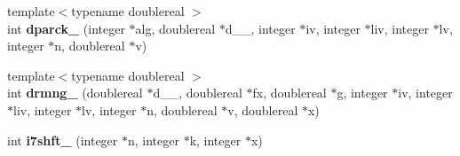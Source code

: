 \begin{DoxyCompactItemize}
\item 
\hypertarget{namespaceport_aa9d480b7014a5add89ca0704e8595e95}{{\footnotesize template$<$typename doublereal $>$ }\\int {\bfseries dparck\+\_\+} (integer $\ast$alg, doublereal $\ast$d\+\_\+\+\_\+, integer $\ast$iv, integer $\ast$liv, integer $\ast$lv, integer $\ast$n, doublereal $\ast$v)}\label{namespaceport_aa9d480b7014a5add89ca0704e8595e95}

\item 
\hypertarget{namespaceport_a08a68b753cfb320121bca4bcdabdb6ab}{{\footnotesize template$<$typename doublereal $>$ }\\int {\bfseries drmng\+\_\+} (doublereal $\ast$d\+\_\+\+\_\+, doublereal $\ast$fx, doublereal $\ast$g, integer $\ast$iv, integer $\ast$liv, integer $\ast$lv, integer $\ast$n, doublereal $\ast$v, doublereal $\ast$x)}\label{namespaceport_a08a68b753cfb320121bca4bcdabdb6ab}

\item 
\hypertarget{namespaceport_a9293ec481b569eec73eaa2ec718507e6}{int {\bfseries i7shft\+\_\+} (integer $\ast$n, integer $\ast$k, integer $\ast$x)}\label{namespaceport_a9293ec481b569eec73eaa2ec718507e6}

\end{DoxyCompactItemize}
